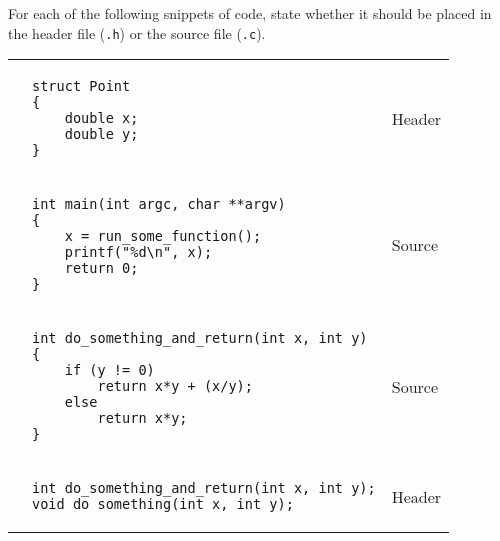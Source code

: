 For each of the following snippets of code, state whether it should be placed in the header file (\texttt{.h}) or the source file (\texttt{.c}).

\begin{enumerate}

\begin{tabular}{p{.25in}p{4.5in} p{2in}}
\item
&
{
\begin{lstlisting}[numbers=none]
struct Point
{
	double x;
	double y;
}
\end{lstlisting}
}
&
\begin{answer}
Header
\end{answer}
\\
\item
&
{
\begin{lstlisting}[numbers=none]
int main(int argc, char **argv)
{
	x = run_some_function();
	printf("%d\n", x);
	return 0;
}
\end{lstlisting}
}
&
\begin{answer}
Source
\end{answer}
\\
\item
&
{
\begin{lstlisting}[numbers=none]
int do_something_and_return(int x, int y)
{
	if (y != 0)
		return x*y + (x/y);
	else
		return x*y;
}
\end{lstlisting}
}
&
\begin{answer}
Source
\end{answer}
\\
\item
&
{
\begin{lstlisting}[numbers=none]
int do_something_and_return(int x, int y);
void do_something(int x, int y);
\end{lstlisting}
}
&
\begin{answer}
Header
\end{answer}
\\
\end{tabular}
\end{enumerate}
